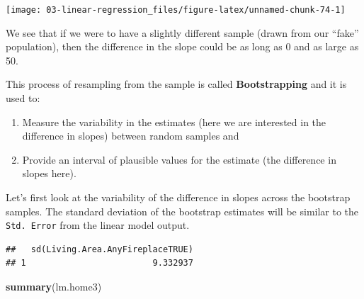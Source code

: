 \documentclass[
]{book}
\newenvironment{Shaded}{\begin{snugshade}}{\end{snugshade}}
\newcommand{\CommentTok}[1]{\textcolor[rgb]{0.56,0.35,0.01}{\textit{#1}}}
\newcommand{\KeywordTok}[1]{\textcolor[rgb]{0.13,0.29,0.53}{\textbf{#1}}}
\newcommand{\NormalTok}[1]{#1}
\newcommand{\OperatorTok}[1]{\textcolor[rgb]{0.81,0.36,0.00}{\textbf{#1}}}
\newcommand{\StringTok}[1]{\textcolor[rgb]{0.31,0.60,0.02}{#1}}
\providecommand{\tightlist}{%
  \setlength{\itemsep}{0pt}\setlength{\parskip}{0pt}}
\begin{document}
\begin{center}\texttt{[image: 03-linear-regression\_files/figure-latex/unnamed-chunk-74-1]} \end{center}

We see that if we were to have a slightly different sample (drawn from our ``fake'' population), then the difference in the slope could be as long as 0 and as large as 50.

This process of resampling from the sample is called \textbf{Bootstrapping} and it is used to:

\begin{enumerate}
\def\labelenumi{\arabic{enumi}.}
\tightlist
\item
  Measure the variability in the estimates (here we are interested in the difference in slopes) between random samples and
\item
  Provide an interval of plausible values for the estimate (the difference in slopes here).
\end{enumerate}

Let's first look at the variability of the difference in slopes across the bootstrap samples. The standard deviation of the bootstrap estimates will be similar to the \texttt{Std.\ Error} from the linear model output.

\begin{Shaded}
\end{Shaded}

\begin{verbatim}
##   sd(Living.Area.AnyFireplaceTRUE)
## 1                         9.332937
\end{verbatim}

\begin{Shaded}
\begin{Highlighting}[]
\KeywordTok{summary}\NormalTok{(lm.home3)}
\end{Highlighting}
\end{Shaded}
\end{document}
